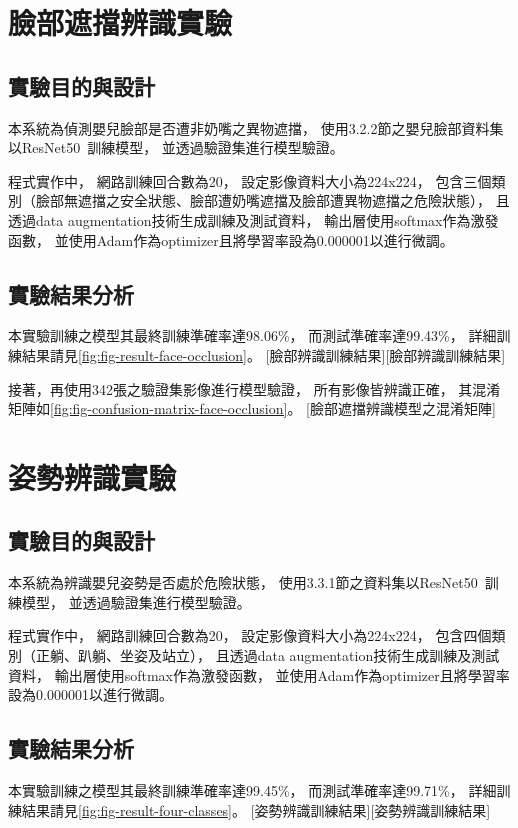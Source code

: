 \documentclass[class=NCU_thesis, crop=false]{standalone}
\begin{document}
\section{臉部遮擋辨識實驗}
\subsection{實驗目的與設計}
本系統為偵測嬰兒臉部是否遭非奶嘴之異物遮擋，
使用3.2.2節之嬰兒臉部資料集以ResNet50~\cite{he_deep_2016}訓練模型，
並透過驗證集進行模型驗證。

程式實作中，
網路訓練回合數為20，
設定影像資料大小為224x224，
包含三個類別（臉部無遮擋之安全狀態、臉部遭奶嘴遮擋及臉部遭異物遮擋之危險狀態），
且透過data augmentation技術生成訓練及測試資料，
輸出層使用softmax作為激發函數，
並使用Adam作為optimizer且將學習率設為0.000001以進行微調。

\subsection{實驗結果分析}
本實驗訓練之模型其最終訓練準確率達98.06\%，
而測試準確率達99.43\%，
詳細訓練結果請見\cref{fig:fig-result-face-occlusion}。
[臉部辨識訓練結果][臉部辨識訓練結果]

接著，再使用342張之驗證集影像進行模型驗證，
所有影像皆辨識正確，
其混淆矩陣如\cref{fig:fig-confusion-matrix-face-occlusion}。
[臉部遮擋辨識模型之混淆矩陣]

\section{姿勢辨識實驗}
\subsection{實驗目的與設計}
本系統為辨識嬰兒姿勢是否處於危險狀態，
使用3.3.1節之資料集以ResNet50~\cite{he_deep_2016}訓練模型，
並透過驗證集進行模型驗證。

程式實作中，
網路訓練回合數為20，
設定影像資料大小為224x224，
包含四個類別（正躺、趴躺、坐姿及站立），
且透過data augmentation技術生成訓練及測試資料，
輸出層使用softmax作為激發函數，
並使用Adam作為optimizer且將學習率設為0.000001以進行微調。

\subsection{實驗結果分析}
本實驗訓練之模型其最終訓練準確率達99.45\%，
而測試準確率達99.71\%，
詳細訓練結果請見\cref{fig:fig-result-four-classes}。
[姿勢辨識訓練結果][姿勢辨識訓練結果]
\end{document}
